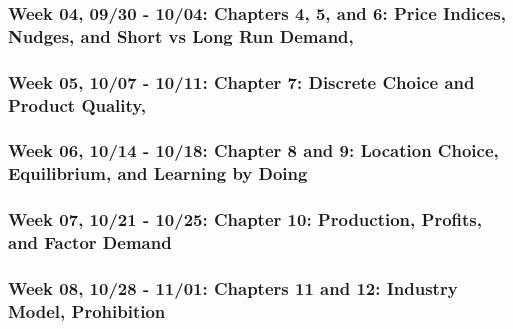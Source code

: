 \documentclass[11pt,]{article}
\begin{document}
\hypertarget{week-04-0930---1004-chapters-4-5-and-6-price-indices-nudges-and-short-vs-long-run-demand}{%
\subsubsection*{Week 04, 09/30 - 10/04: Chapters 4, 5, and 6: Price Indices, Nudges, and Short vs Long Run Demand,}\label{week-04-0930---1004-chapters-4-5-and-6-price-indices-nudges-and-short-vs-long-run-demand}}

\hypertarget{week-05-1007---1011-chapter-7-discrete-choice-and-product-quality}{%
\subsubsection*{Week 05, 10/07 - 10/11: Chapter 7: Discrete Choice and Product Quality,}\label{week-05-1007---1011-chapter-7-discrete-choice-and-product-quality}}

\hypertarget{week-06-1014---1018-chapter-8-and-9-location-choice-equilibrium-and-learning-by-doing}{%
\subsubsection*{Week 06, 10/14 - 10/18: Chapter 8 and 9: Location Choice, Equilibrium, and Learning by Doing}\label{week-06-1014---1018-chapter-8-and-9-location-choice-equilibrium-and-learning-by-doing}}

\hypertarget{week-07-1021---1025-chapter-10-production-profits-and-factor-demand}{%
\subsubsection*{Week 07, 10/21 - 10/25: Chapter 10: Production, Profits, and Factor Demand}\label{week-07-1021---1025-chapter-10-production-profits-and-factor-demand}}

\hypertarget{week-08-1028---1101-chapters-11-and-12-industry-model-prohibition}{%
\subsubsection*{Week 08, 10/28 - 11/01: Chapters 11 and 12: Industry Model, Prohibition}\label{week-08-1028---1101-chapters-11-and-12-industry-model-prohibition}}
\end{document}
